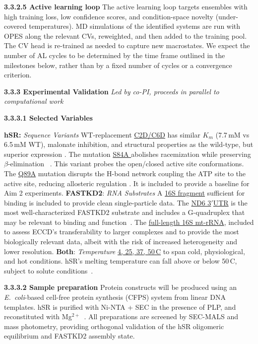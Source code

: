 \documentclass[11pt]{article}
\begin{document}
\textbf{3.3.2.5 Active learning loop} The active learning loop targets ensembles with high training loss, low confidence scores, and condition-space novelty (under-covered temperatures). MD simulations of the identified systems are run with OPES along the relevant CVs, reweighted, and then added to the training pool. The CV head is re-trained as needed to capture new macrostates. We expect the number of AL cycles to be determined by the time frame outlined in the milestones below, rather than by a fixed number of cycles or a convergence criterion.


\textbf{3.3.3 Experimental Validation} \textit{Led by co-PI, proceeds in parallel to computational work}\label{sec:aim1exp}

\textbf{3.3.3.1 Selected Variables}

\textbf{hSR:} \emph{Sequence Variants} WT-replacement \uline{C2D/C6D} has similar $K_m$ (7.7\,mM vs 6.5\,mM WT), malonate inhibition, and structural properties as the wild-type, but superior expression \cite{smith_Structure_2010}. The mutation \uline{S84A } abolishes racemization while preserving $\beta$-elimination ~\cite{hoffman_Human_2016}. This variant probes the open/closed active site conformations. The \uline{Q89A} mutation disrupts the H-bond network coupling the ATP site to the active site, reducing allosteric regulation \cite{mozzarelli_EnergyLandscape_2018}. It is included to provide a baseline for Aim 2 experiments.  \textbf{FASTKD2}: \emph{RNA Substrates} A \uline{16S fragment} sufficient for binding is included to provide clean single-particle data. The \uline{ND6 3$'$UTR} is the most well-characterized FASTKD2 substrate and includes a G-quadruplex that may be relevant to binding and function~\cite{antonicka_Pseudouridine_2017}. The \uline{full-length 16S mt-rRNA}, included to assess ECCD's transferability to larger complexes and to provide the most biologically relevant data, albeit with the risk of increased heterogeneity and lower resolution.  \textbf{Both}: \emph{Temperature} \uline{4, 25, 37, 50\,\textdegree C} to span cold, physiological, and hot conditions. hSR's melting temperature can fall above or below 50\,\textdegree C, subject to solute conditions~\cite{bruno_Regulation_2017}.

\textbf{3.3.3.2 Sample preparation} Protein constructs will be produced using an \emph{E.~coli}-based cell-free protein synthesis (CFPS) system from linear DNA templates. hSR is purified with Ni-NTA + SEC in the presence of PLP, and reconstituted with Mg$^{2+}$~\cite{bruno_Regulation_2017}. All preparations are screened by SEC-MALS and mass photometry, providing orthogonal validation of the hSR oligomeric equilibrium and FASTKD2 assembly state.
\end{document}
